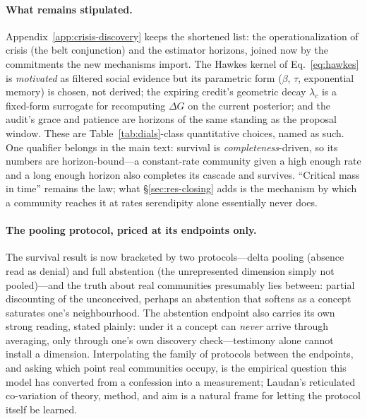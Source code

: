 \documentclass[11pt]{article}
\begin{document}
\paragraph{What remains stipulated.}
Appendix~\ref{app:crisis-discovery} keeps the shortened list: the operationalization of crisis
(the belt conjunction) and the estimator horizons, joined now by the commitments the new
mechanisms import. The Hawkes kernel of Eq.~\eqref{eq:hawkes} is \emph{motivated} as filtered
social evidence but its parametric form ($\beta$, $\tau$, exponential memory) is chosen, not
derived; the expiring credit's geometric decay $\lambda_c$ is a fixed-form surrogate for
recomputing $\Delta G$ on the current posterior; and the audit's grace and patience are horizons
of the same standing as the proposal window. These are Table~\ref{tab:dials}-class quantitative
choices, named as such. One qualifier belongs in the main text: survival is
\emph{completeness}-driven, so its numbers are horizon-bound---a constant-rate community given a
high enough rate and a long enough horizon also completes its cascade and survives. ``Critical
mass in time'' remains the law; what \S\ref{sec:res-closing} adds is the mechanism by which a
community reaches it at rates serendipity alone essentially never does.

\paragraph{The pooling protocol, priced at its endpoints only.}
The survival result is now bracketed by two protocols---delta pooling (absence read as denial)
and full abstention (the unrepresented dimension simply not pooled)---and the truth about real
communities presumably lies between: partial discounting of the unconceived, perhaps an
abstention that softens as a concept saturates one's neighbourhood. The abstention endpoint also
carries its own strong reading, stated plainly: under it a concept can \emph{never} arrive
through averaging, only through one's own discovery check---testimony alone cannot install a
dimension. Interpolating the family of protocols between the endpoints, and asking which point
real communities occupy, is the empirical question this model has converted from a confession
into a measurement; Laudan's reticulated co-variation of theory, method, and aim
\citep{laudan1984} is a natural frame for letting the protocol itself be learned.
\end{document}
